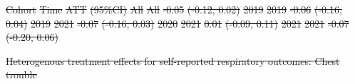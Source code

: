 \documentclass[
  letterpaper,
  DIV=11,
  numbers=noendperiod]{scrartcl}
\makeatletter
\renewenvironment{table}%
   {\renewcommand\familydefault\sfdefault
    \@float{table}}
   {\end@float}
\providecommand{\DIFdel}[1]{{\protect\color{red}\sout{#1}}}                      %
\providecommand{\DIFdelFL}[1]{\DIFdel{#1}} %
\makeatother
\begin{document}
\DIFdelFL{Cohort }%
\DIFdelFL{Time }%
\DIFdelFL{ATT }%
\DIFdelFL{(95\%CI)}%
\DIFdelFL{All }%
\DIFdelFL{All }%
\DIFdelFL{-0.05 }%
\DIFdelFL{(-0.12, 0.02)}%
\DIFdelFL{2019 }%
\DIFdelFL{2019 }%
\DIFdelFL{-0.06 }%
\DIFdelFL{(-0.16, 0.04)}%
\DIFdelFL{2019 }%
\DIFdelFL{2021 }%
\DIFdelFL{-0.07 }%
\DIFdelFL{(-0.16, 0.03)}%
\DIFdelFL{2020 }%
\DIFdelFL{2021 }%
\DIFdelFL{0.01 }%
\DIFdelFL{(-0.09, 0.11)}%
\DIFdelFL{2021 }%
\DIFdelFL{2021 }%
\DIFdelFL{-0.07 }%
\DIFdelFL{(-0.20, 0.06)}%

{%
\DIFdelFL{Heterogenous treatment effects for self-reported respiratory outcomes:
Chest trouble }}%
\end{document}
